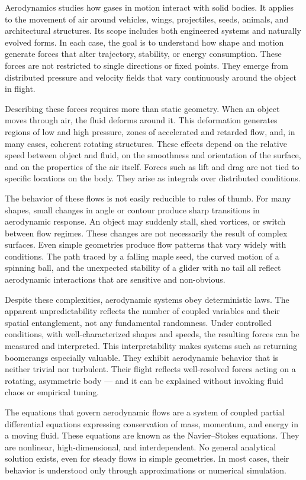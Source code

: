 
Aerodynamics studies how gases in motion interact with solid bodies. It applies to the movement of air around vehicles, wings, projectiles, seeds, animals, and architectural structures. Its scope includes both engineered systems and naturally evolved forms. In each case, the goal is to understand how shape and motion generate forces that alter trajectory, stability, or energy consumption. These forces are not restricted to single directions or fixed points. They emerge from distributed pressure and velocity fields that vary continuously around the object in flight.

Describing these forces requires more than static geometry. When an object moves through air, the fluid deforms around it. This deformation generates regions of low and high pressure, zones of accelerated and retarded flow, and, in many cases, coherent rotating structures. These effects depend on the relative speed between object and fluid, on the smoothness and orientation of the surface, and on the properties of the air itself. Forces such as lift and drag are not tied to specific locations on the body. They arise as integrals over distributed conditions.

The behavior of these flows is not easily reducible to rules of thumb. For many shapes, small changes in angle or contour produce sharp transitions in aerodynamic response. An object may suddenly stall, shed vortices, or switch between flow regimes. These changes are not necessarily the result of complex surfaces. Even simple geometries produce flow patterns that vary widely with conditions. The path traced by a falling maple seed, the curved motion of a spinning ball, and the unexpected stability of a glider with no tail all reflect aerodynamic interactions that are sensitive and non-obvious.

Despite these complexities, aerodynamic systems obey deterministic laws. The apparent unpredictability reflects the number of coupled variables and their spatial entanglement, not any fundamental randomness. Under controlled conditions, with well-characterized shapes and speeds, the resulting forces can be measured and interpreted. This interpretability makes systems such as returning boomerangs especially valuable. They exhibit aerodynamic behavior that is neither trivial nor turbulent. Their flight reflects well-resolved forces acting on a rotating, asymmetric body — and it can be explained without invoking fluid chaos or empirical tuning.

The equations that govern aerodynamic flows are a system of coupled partial differential equations expressing conservation of mass, momentum, and energy in a moving fluid. These equations are known as the Navier–Stokes equations. They are nonlinear, high-dimensional, and interdependent. No general analytical solution exists, even for steady flows in simple geometries. In most cases, their behavior is understood only through approximations or numerical simulation.

